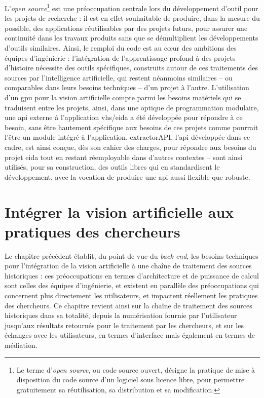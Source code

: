 \documentclass[a4paper,12pt,twoside]{book}
\newcommand{\api}{\gls{api}\xspace}
\newcommand{\eida}{\gls{eida}\xspace}
\newcommand{\exapi}{extractorAPI\xspace}
\newcommand{\gpu}{\gls{gpu}\xspace}
\newcommand{\ia}{intelligence artificielle\xspace}
\newcommand{\vhs}{\gls{vhs}\xspace}
\newcommand{\clearemptydoublepage}{\newpage{\pagestyle{empty}\cleardoublepage}}
\begin{document}
        L'\textit{open source}\footnote{Le terme d'\textit{open source}, ou code source ouvert, désigne la pratique de mise à disposition du code source d'un logiciel sous licence libre, pour permettre gratuitement sa réutilisation, sa distribution et sa modification.} est une préoccupation centrale lors du développement d'outil pour les projets de recherche : il est en effet souhaitable de produire, dans la mesure du possible, des applications réutilisables par des projets futurs, pour assurer une continuité dans les travaux produits sans que se démultiplient les développements d'outils similaires. Ainsi, le remploi du code est au cœur des ambitions des équipes d'ingénierie : l'intégration de l'apprentissage profond à des projets d'histoire nécessite des outils spécifiques, construits autour de ces traitements des sources par l'\ia, qui restent néanmoins similaires -- ou comparables dans leurs besoins techniques -- d'un projet à l'autre. L'utilisation d'un \gpu pour la vision artificielle compte parmi les besoins matériels qui se traduisent entre les projets, ainsi, dans une optique de programmation modulaire, une \api externe à l'application \vhs/\eida a été développée pour répondre à ce besoin, sans être hautement spécifique aux besoins de ces projets comme pourrait l'être un module intégré à l'application. \exapi, l'\api développée dans ce cadre, est ainsi conçue, dès son cahier des charges, pour répondre aux besoins du projet \eida tout en restant réemployable dans d'autres contextes -- sont ainsi utilisés, pour sa construction, des outils libres qui en standardisent le développement, avec la vocation de produire une \api aussi flexible que robuste.
        \clearemptydoublepage
            
      	\chapter[\textit{Computer vision} et pratiques des chercheurs]{Intégrer la vision artificielle aux pratiques des chercheurs}
      	
      	Le chapitre précédent établit, du point de vue du \textit{back end}, les besoins techniques pour l'intégration de la vision artificielle à une chaîne de traitement des sources historiques : ces préoccupations en termes d'architecture et de puissance de calcul sont celles des équipes d'ingénierie, et existent en parallèle des préoccupations qui concernent plus directement les utilisateurs, et impactent réellement les pratiques des chercheurs. Ce chapitre revient ainsi sur la chaîne de traitement des sources historiques dans sa totalité, depuis la numérisation fournie par l'utilisateur jusqu'aux résultats retournés pour le traitement par les chercheurs, et sur les échanges avec les utilisateurs, en termes d'interface mais également en termes de médiation.
               
\end{document}
